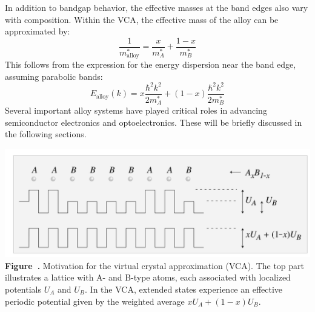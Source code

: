 In addition to bandgap behavior, the effective masses at the band edges also vary with composition. Within the VCA, the effective mass of the alloy can be approximated by:
\begin{equation}
	\frac{1}{m^*_{\text{alloy}}} = \frac{x}{m^*_A} + \frac{1 - x}{m^*_B}
\end{equation}
This follows from the expression for the energy dispersion near the band edge, assuming parabolic bands:
\begin{equation}
	E_{\text{alloy}}(k) = x \frac{\hbar^2 k^2}{2 m^*_A} + (1 - x) \frac{\hbar^2 k^2}{2 m^*_B}
\end{equation}
Several important alloy systems have played critical roles in advancing semiconductor electronics and optoelectronics. These will be briefly discussed in the following sections.
\begin{center}
	\begin{minipage}{0.9\textwidth}
		\centering
		\includegraphics[width=\textwidth]{img/VCA.png}
		\\[0.5em]
		\textbf{Figure~\thefigure.} Motivation for the virtual crystal approximation (VCA). The top part illustrates a lattice with A- and B-type atoms, each associated with localized potentials $U_A$ and $U_B$. In the VCA, extended states experience an effective periodic potential given by the weighted average $xU_A + (1 - x)U_B$.
		\label{fig:VCA}
	\end{minipage}
\end{center}

